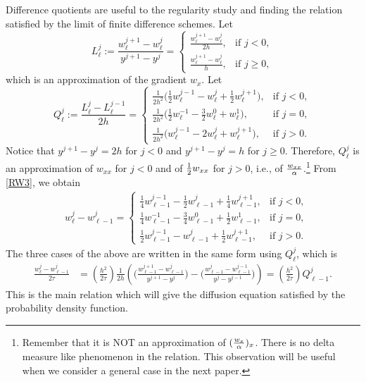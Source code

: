 \documentclass[a4paper,11pt]{article}
\def\l{{h}}
\theoremstyle{remark}
\begin{document}
Difference quotients are useful to the regularity study and finding the relation satisfied by the limit of finite difference schemes. Let
\begin{equation}\label{Ljl}
L^j_\ell := \frac{w_\ell^{j+1}-w_\ell^j}{y^{j+1}-y^j}
        =\left\{\begin{array}{ll}
        \frac{w^{j+1}_{\ell} - w^{j}_{\ell}}{2\l}, & \text{if $j<0$},\\
        \frac{w^{j+1}_{\ell} - w^{j}_{\ell}}{\l}, & \text{if }  j\ge0,
        \end{array}\right.
\end{equation}
which is an approximation of the gradient $w_x$. Let
\begin{equation}\label{Qjl}
Q^j_\ell := \frac{L^j_\ell-L^{j-1}_\ell}{2h}= \left\{\begin{array}{ll}
        \frac{1}{2\l^2}\Big( \frac{1}{2} w^{j-1} _{\ell} - w ^{j} _{\ell} +
        \frac{1}{2} w^{j+1} _{\ell}\Big), & \text{if $j<0$},\\
        \frac{1}{2\l^2}\Big( \frac{1}{2} w^{-1} _{\ell} - \frac{3}{2}w
        ^{0} _{\ell} +w^{1} _{\ell}\Big), & \text{if $j=0$},\\
        \frac{1}{2\l^2}\Big(w^{j-1} _{\ell} - 2w^j_\ell + w ^{j+1}
        _{\ell}\Big), & \text{if $j>0$}.
        \end{array}\right.
\end{equation}
Notice that $y^{j+1}-y^{j}=2h$ for $j<0$ and $y^{j+1}-y^{j}=h$ for $j\ge0$. Therefore, $Q^j_\ell$ is an approximation of $w_{xx}$ for $j<0$ and of ${1\over2}w_{xx}$ for $j>0$, i.e., of ${w_{xx}\over\alpha}$.\footnote{Remember that it is NOT an approximation of $({w_x\over\alpha})_x$. There is no delta measure like phenomenon in the relation. This observation will be useful when we consider a general case in the next paper.} From \eqref{RW3}, we obtain
$$
\begin{aligned}
    &w^{j}_\ell-w^{j}_{\ell-1} = \left\{\begin{array}{ll}
        \frac{1}{4}w^{j-1} _{\ell-1} - \frac{1}{2}w ^{j} _{\ell-1} +
        \frac{1}{4} w^{j+1}_{\ell-1}, & \text{if $j<0$},\\
        \frac{1}{4}w^{-1} _{\ell-1} - \frac{3}{4}w^{0} _{\ell-1} +
        \frac{1}{2}w ^{1} _{\ell-1}, & \text{if $j=0$},\\
        \frac{1}{2}w^{j-1} _{\ell-1}-w^{j}_{\ell-1} + \frac{1}{2}w ^{j+1}
        _{\ell-1}, & \text{if } j>0.
        \end{array}\right.
\end{aligned}
$$
The three cases of the above are written in the same form using $Q_\ell^j$,
which is
\begin{equation} \label{RW1w}
\begin{aligned}
 \frac{w^j_\ell - w^j_{\ell-1}}{2\tau} &= \left(\frac{h^2}{2\tau}\right)
 \frac{1}{2h}\left( \Big(\tfrac{w^{j+1}_{\ell-1} -
 w^{j}_{\ell-1}}{y^{j+1}-y^j}\Big) -\Big(\tfrac{w^{j}_{\ell-1} -
 w^{j-1}_{\ell-1}}{y^{j}-y^{j-1}} \Big)\right)=
 \left(\frac{h^2}{2\tau}\right)Q^j_{\ell-1}.
  \end{aligned}
\end{equation}
This is the main relation which will give the diffusion equation satisfied by the probability density function.
\end{document}
